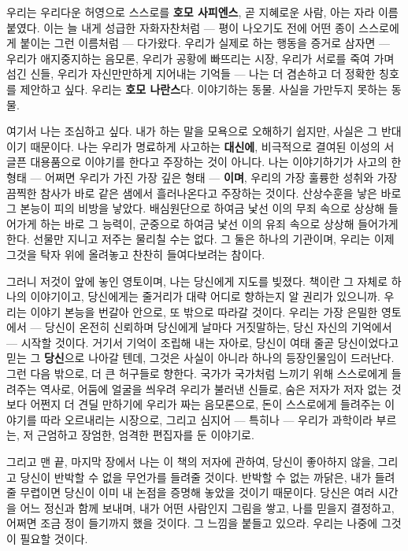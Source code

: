 우리는 우리다운 허영으로 스스로를 \textbf{호모 사피엔스}, 곧 지혜로운 사람, 아는 자라 이름 붙였다. 이는 늘 내게 성급한 자화자찬처럼 — 평이 나오기도 전에 어떤 종이 스스로에게 붙이는 그런 이름처럼 — 다가왔다. 우리가 실제로 하는 행동을 증거로 삼자면 — 우리가 애지중지하는 음모론, 우리가 공황에 빠뜨리는 시장, 우리가 서로를 죽여 가며 섬긴 신들, 우리가 자신만만하게 지어내는 기억들 — 나는 더 겸손하고 더 정확한 칭호를 제안하고 싶다. 우리는 \textbf{호모 나란스}다. 이야기하는 동물. 사실을 가만두지 못하는 동물.

여기서 나는 조심하고 싶다. 내가 하는 말을 모욕으로 오해하기 쉽지만, 사실은 그 반대이기 때문이다. 나는 우리가 명료하게 사고하는 \textbf{대신에}, 비극적으로 결여된 이성의 서글픈 대용품으로 이야기를 한다고 주장하는 것이 아니다. 나는 이야기하기가 사고의 한 형태 — 어쩌면 우리가 가진 가장 깊은 형태 — \textbf{이며}, 우리의 가장 훌륭한 성취와 가장 끔찍한 참사가 바로 같은 샘에서 흘러나온다고 주장하는 것이다. 산상수훈을 낳은 바로 그 본능이 피의 비방을 낳았다. 배심원단으로 하여금 낯선 이의 무죄 속으로 상상해 들어가게 하는 바로 그 능력이, 군중으로 하여금 낯선 이의 유죄 속으로 상상해 들어가게 한다. 선물만 지니고 저주는 물리칠 수는 없다. 그 둘은 하나의 기관이며, 우리는 이제 그것을 탁자 위에 올려놓고 찬찬히 들여다보려는 참이다.

그러니 저것이 앞에 놓인 영토이며, 나는 당신에게 지도를 빚졌다. 책이란 그 자체로 하나의 이야기이고, 당신에게는 줄거리가 대략 어디로 향하는지 알 권리가 있으니까. 우리는 이야기 본능을 번갈아 안으로, 또 밖으로 따라갈 것이다. 우리는 가장 은밀한 영토에서 — 당신이 온전히 신뢰하며 당신에게 날마다 거짓말하는, 당신 자신의 기억에서 — 시작할 것이다. 거기서 기억이 조립해 내는 자아로, 당신이 여태 줄곧 당신이었다고 믿는 그 \textbf{당신}으로 나아갈 텐데, 그것은 사실이 아니라 하나의 등장인물임이 드러난다. 그런 다음 밖으로, 더 큰 허구들로 향한다. 국가가 국가처럼 느끼기 위해 스스로에게 들려주는 역사로, 어둠에 얼굴을 씌우려 우리가 불러낸 신들로, 숨은 저자가 저자 없는 것보다 어쩐지 더 견딜 만하기에 우리가 짜는 음모론으로, 돈이 스스로에게 들려주는 이야기를 따라 오르내리는 시장으로, 그리고 심지어 — 특히나 — 우리가 과학이라 부르는, 저 근엄하고 장엄한, 엄격한 편집자를 둔 이야기로.

그리고 맨 끝, 마지막 장에서 나는 이 책의 저자에 관하여, 당신이 좋아하지 않을, 그리고 당신이 반박할 수 없을 무언가를 들려줄 것이다. 반박할 수 없는 까닭은, 내가 들려줄 무렵이면 당신이 이미 내 논점을 증명해 놓았을 것이기 때문이다. 당신은 여러 시간을 어느 정신과 함께 보내며, 내가 어떤 사람인지 그림을 쌓고, 나를 믿을지 결정하고, 어쩌면 조금 정이 들기까지 했을 것이다. 그 느낌을 붙들고 있으라. 우리는 나중에 그것이 필요할 것이다.

